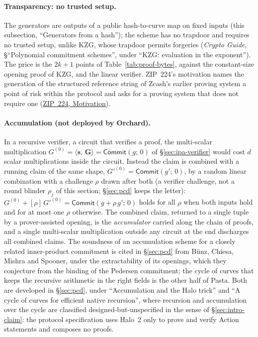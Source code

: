 \documentclass[11pt,a4paper]{article}
\theoremstyle{definition}
\newcommand{\ip}[2]{\langle #1,\, #2 \rangle}
\newcommand{\Comm}{\mathsf{Commit}}
\begin{document}
\paragraph{Transparency: no trusted setup.}
The generators are outputs of a public hash-to-curve map on fixed inputs
(this subsection, ``Generators from a hash''); the scheme has no trapdoor
and requires no trusted setup, unlike KZG, whose trapdoor permits
forgeries (\emph{Crypto Guide}, \S``Polynomial commitment schemes'', under
``KZG: evaluation in the exponent''). The price is the $2k + 1$ points of
Table~\ref{tab:proof-bytes}, against the constant-size opening proof of
KZG, and the linear verifier. ZIP~224's motivation names the generation of
the structured reference string of Zcash's earlier proving system a point
of risk within the protocol and asks for a proving system that does not
require one
(\href{https://zips.z.cash/zip-0224\#motivation}{ZIP~224, Motivation}).

\paragraph{Accumulation (not deployed by Orchard).}
In a recursive verifier, a circuit that verifies a proof, the
multi-scalar multiplication $G^{(0)} = \ip{\mathbf s}{\mathbf G} =
\Comm(g;\, 0)$ of \S\ref{sec:ipa-verifier} would cost $d$ scalar
multiplications inside the circuit. Instead the claim is combined with
a running claim of the same shape, $G'^{(0)} = \Comm(g';\, 0)$, by a
random linear combination with a challenge $\rho$ drawn after both (a
verifier challenge, not a round blinder $\rho_j$ of this section;
\S\ref{sec:pcd} keeps the letter):
$G^{(0)} + [\rho]\,G'^{(0)} = \Comm(g + \rho\,g';\, 0)$ holds for all
$\rho$ when both inputs hold and for at most one $\rho$ otherwise. The
combined claim, returned to a single tuple by a prover-assisted opening,
is the \emph{accumulator} carried along the chain of proofs, and a
single multi-scalar multiplication outside any circuit at the end
discharges all combined claims. The soundness of an accumulation scheme
for a closely related inner-product commitment is cited in
\S\ref{sec:pcd} from B\"unz, Chiesa, Mishra and Spooner, under the
extractability of its openings, which they conjecture from the binding
of the Pedersen commitment; the cycle of curves that
keeps the recursive arithmetic in the right fields is the other half of
Pasta. Both are developed in \S\ref{sec:pcd}, under ``Accumulation and
the Halo trick'' and ``A cycle of curves for efficient native recursion'',
where recursion and accumulation over the cycle are classified
designed-but-unspecified in the sense of \S\ref{sec:intro-claim}: the
protocol specification uses Halo~2 only to prove and verify Action
statements and composes no proofs.
\end{document}
